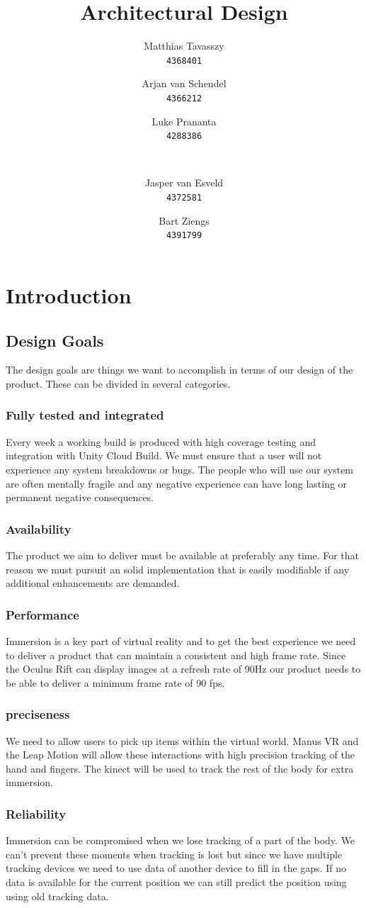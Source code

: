 \documentclass[11pt,a4paper]{report}
\title{Architectural Design }
\author{
Matthias Tavasszy \\
\texttt{4368401}	
\and
Arjan van Schendel \\
\texttt{4366212}
\and
Luke Prananta \\ 
\texttt{4288386}  
\and
$$ $$ \\
\texttt{}
\and
Jasper van Esveld \\
\texttt{4372581}
\and
Bart Ziengs \\ 
\texttt{4391799}
}
\begin{document}
\maketitle


\tableofcontents
\chapter*{Introduction}
\section*{Design Goals}
The design goals are things we want to accomplish in terms of our design of the product.
These can be divided in several categories.
\subsection*{Fully tested and integrated}
Every week a working build is produced with high coverage testing and integration with
Unity Cloud Build. We must ensure that a user will not experience any system breakdowns or
bugs. The people who will use our system are often mentally fragile and any negative
experience can have long lasting or permanent negative consequences.
\subsection*{Availability}
The product we aim to deliver must be available at preferably any time. For that reason we must pursuit an solid implementation that is easily modifiable if any additional enhancements are demanded. 
\subsection*{Performance}
Immersion is a key part of virtual reality and to get the best experience we need to deliver a
product that can maintain a consistent and high frame rate. Since the Oculus Rift can display
images at a refresh rate of 90Hz our product needs to be able to deliver a minimum frame rate
of 90 fps.
\subsection*{preciseness}
We need to allow users to pick up items within the virtual world. Manus VR and the Leap
Motion will allow these interactions with high precision tracking of the hand and fingers. The
kinect will be used to track the rest of the body for extra immersion.
\subsection*{Reliability}
Immersion can be compromised when we lose tracking of a part of the body. We can’t
prevent these moments when tracking is lost but since we have multiple tracking devices we
need to use data of another device to fill in the gaps. If no data is available for the current
position we can still predict the position using using old tracking data.
\end{document}
